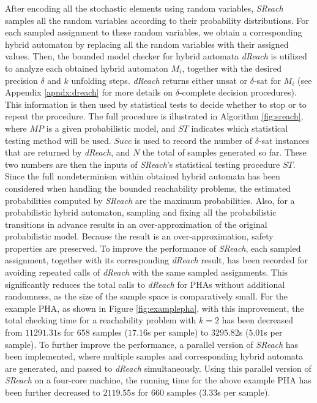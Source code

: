 After encoding all the stochastic elements using random variables, {\it SReach} samples all the random variables according to their probability distributions. For each sampled assignment to these random variables, we obtain a corresponding hybrid automaton by replacing all the random variables with their assigned values. Then, the bounded model checker for hybrid automata {\it dReach} \cite{gaodelta} is utilized to analyze each obtained hybrid automaton $M_i$, together with the desired precision $\delta$ and $k$ unfolding steps. {\it dReach} returns either unsat or $\delta$-sat for $M_i$ (see Appendix \ref{apndx:dreach} for more details on $\delta$-complete decision procedures). This information
is then used by statistical tests to decide whether to stop or to repeat the procedure. The full procedure is illustrated in Algorithm \ref{fig:sreach}, where $MP$ is a given probabilistic model, and $ST$ indicates which statistical testing method will be used. $Succ$ is used to record the number of $\delta$-sat instances that are returned by {\it dReach}, and $N$ the total of samples generated so far. These two numbers are then the inputs of {\it SReach}'s statistical testing procedure $ST$. Since the full nondeterminism within obtained hybrid automata has been considered when handling the bounded reachability problems, the estimated probabilities computed by {\it SReach} are the maximum probabilities. Also, for a probabilistic hybrid automaton, sampling and fixing all the probabilistic transitions in advance results in an over-approximation of the original probabilistic model. Because the result is an over-approximation, safety properties are preserved. To improve the performance of {\it SReach}, each sampled assignment, together with its corresponding {\it dReach} result, has been recorded for avoiding repeated calls of {\it dReach} with the same sampled assignments. This significantly reduces the total calls to {\it dReach} for PHAs without additional randomness, as the size of the sample space is comparatively small. For the example PHA, as shown in Figure \ref{fig:examplepha}, with this improvement, the total checking time for a reachability problem with $k=2$ has been decreased from $11291.31$s for $658$ samples ($17.16$s per sample) to $3295.82$s ($5.01$s per sample). To further improve the performance, a parallel version of {\it SReach} has been implemented, where multiple samples and corresponding hybrid automata are generated, and passed to {\it dReach} simultaneously. Using this parallel version of {\it SReach} on a four-core machine, the running time for the above example PHA has been further decreased to $2119.55s$ for $660$ samples ($3.33$s per sample). 

